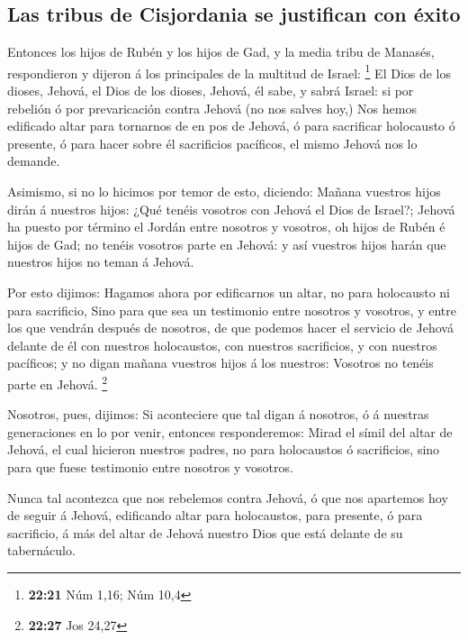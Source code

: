 \hypertarget{las-tribus-de-cisjordania-se-justifican-con-uxe9xito}{%
\subsection{Las tribus de Cisjordania se justifican con
éxito}\label{las-tribus-de-cisjordania-se-justifican-con-uxe9xito}}

 Entonces los hijos de Rubén y los hijos de Gad, y la
media tribu de Manasés, respondieron y dijeron á los principales de la
multitud de Israel: \footnote{\textbf{22:21} Núm 1,16; Núm 10,4}
 El Dios de los dioses, Jehová, el Dios de los dioses,
Jehová, él sabe, y sabrá Israel: si por rebelión ó por prevaricación
contra Jehová (no nos salves hoy,)  Nos hemos edificado
altar para tornarnos de en pos de Jehová, ó para sacrificar holocausto ó
presente, ó para hacer sobre él sacrificios pacíficos, el mismo Jehová
nos lo demande.

 Asimismo, si no lo hicimos por temor de esto, diciendo:
Mañana vuestros hijos dirán á nuestros hijos: ¿Qué tenéis vosotros con
Jehová el Dios de Israel?;  Jehová ha puesto por término
el Jordán entre nosotros y vosotros, oh hijos de Rubén é hijos de Gad;
no tenéis vosotros parte en Jehová: y así vuestros hijos harán que
nuestros hijos no teman á Jehová.

 Por esto dijimos: Hagamos ahora por edificarnos un
altar, no para holocausto ni para sacrificio,  Sino para
que sea un testimonio entre nosotros y vosotros, y entre los que vendrán
después de nosotros, de que podemos hacer el servicio de Jehová delante
de él con nuestros holocaustos, con nuestros sacrificios, y con nuestros
pacíficos; y no digan mañana vuestros hijos á los nuestros: Vosotros no
tenéis parte en Jehová. \footnote{\textbf{22:27} Jos 24,27}

 Nosotros, pues, dijimos: Si aconteciere que tal digan á
nosotros, ó á nuestras generaciones en lo por venir, entonces
responderemos: Mirad el símil del altar de Jehová, el cual hicieron
nuestros padres, no para holocaustos ó sacrificios, sino para que fuese
testimonio entre nosotros y vosotros.

 Nunca tal acontezca que nos rebelemos contra Jehová, ó
que nos apartemos hoy de seguir á Jehová, edificando altar para
holocaustos, para presente, ó para sacrificio, á más del altar de Jehová
nuestro Dios que está delante de su tabernáculo.

